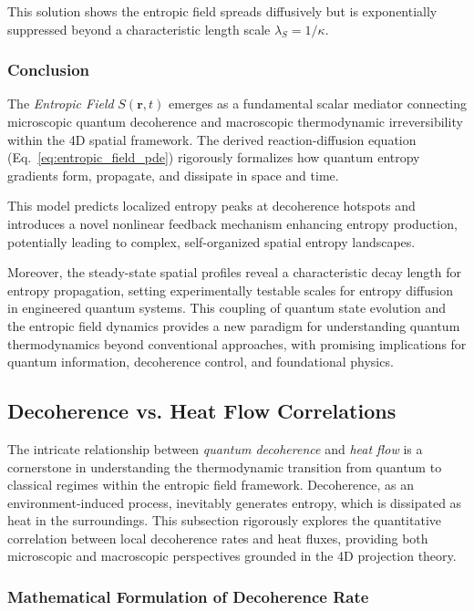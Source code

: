 \documentclass[12pt]{article}
\begin{document}
This solution shows the entropic field spreads diffusively but is exponentially suppressed beyond a characteristic length scale \(\lambda_S = 1/\kappa\).

\subsubsection*{Conclusion}

The \emph{Entropic Field} \(S(\mathbf{r}, t)\) emerges as a fundamental scalar mediator connecting microscopic quantum decoherence and macroscopic thermodynamic irreversibility within the 4D spatial framework. The derived reaction-diffusion equation (Eq.~\eqref{eq:entropic_field_pde}) rigorously formalizes how quantum entropy gradients form, propagate, and dissipate in space and time. 

This model predicts localized entropy peaks at decoherence hotspots and introduces a novel nonlinear feedback mechanism enhancing entropy production, potentially leading to complex, self-organized spatial entropy landscapes. 

Moreover, the steady-state spatial profiles reveal a characteristic decay length for entropy propagation, setting experimentally testable scales for entropy diffusion in engineered quantum systems. This coupling of quantum state evolution and the entropic field dynamics provides a new paradigm for understanding quantum thermodynamics beyond conventional approaches, with promising implications for quantum information, decoherence control, and foundational physics.


\subsection{Decoherence vs. Heat Flow Correlations}

The intricate relationship between \emph{quantum decoherence} and \emph{heat flow} is a cornerstone in understanding the thermodynamic transition from quantum to classical regimes within the entropic field framework. Decoherence, as an environment-induced process, inevitably generates entropy, which is dissipated as heat in the surroundings. This subsection rigorously explores the quantitative correlation between local decoherence rates and heat fluxes, providing both microscopic and macroscopic perspectives grounded in the 4D projection theory.

\subsubsection*{Mathematical Formulation of Decoherence Rate}
\end{document}
